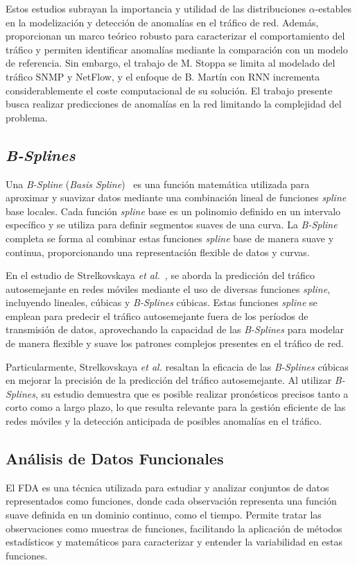 Estos estudios subrayan la importancia y utilidad de las distribuciones $\alpha$-estables en la modelización y detección de anomalías en el tráfico de red. Además, proporcionan un marco teórico robusto para caracterizar el comportamiento del tráfico y permiten identificar anomalías mediante la comparación con un modelo de referencia. Sin embargo, el trabajo de M. Stoppa se limita al modelado del tráfico SNMP y NetFlow, y el enfoque de B. Martín con \ac{RNN} incrementa considerablemente el coste computacional de su solución. El trabajo presente busca realizar predicciones de anomalías en la red limitando la complejidad del problema.

\subsection{\textit{B-Splines}} %
Una \textit{B-Spline} (\textit{Basis Spline})~\cite{prautzsch2002bezier} es una función matemática utilizada para aproximar y suavizar datos mediante una combinación lineal de funciones \textit{spline} base locales. Cada función \textit{spline} base es un polinomio definido en un intervalo específico y se utiliza para definir segmentos suaves de una curva. La \textit{B-Spline} completa se forma al combinar estas funciones \textit{spline} base de manera suave y continua, proporcionando una representación flexible de datos y curvas.

En el estudio de Strelkovskaya \textit{et al.}~\cite{strelkovskaya2019}, se aborda la predicción del tráfico autosemejante en redes móviles mediante el uso de diversas funciones \textit{spline}, incluyendo lineales, cúbicas y \textit{B-Splines} cúbicas. Estas funciones \textit{spline} se emplean para predecir el tráfico autosemejante fuera de los períodos de transmisión de datos, aprovechando la capacidad de las \textit{B-Splines} para modelar de manera flexible y suave los patrones complejos presentes en el tráfico de red.

Particularmente, Strelkovskaya \textit{et al.} resaltan la eficacia de las \textit{B-Splines} cúbicas en mejorar la precisión de la predicción del tráfico autosemejante. Al utilizar \textit{B-Splines}, su estudio demuestra que es posible realizar pronósticos precisos tanto a corto como a largo plazo, lo que resulta relevante para la gestión eficiente de las redes móviles y la detección anticipada de posibles anomalías en el tráfico.

\subsection{Análisis de Datos Funcionales} %
El \ac{FDA} es una técnica utilizada para estudiar y analizar conjuntos de datos representados como funciones, donde cada observación representa una función suave definida en un dominio continuo, como el tiempo. Permite tratar las observaciones como muestras de funciones, facilitando la aplicación de métodos estadísticos y matemáticos para caracterizar y entender la variabilidad en estas funciones.

